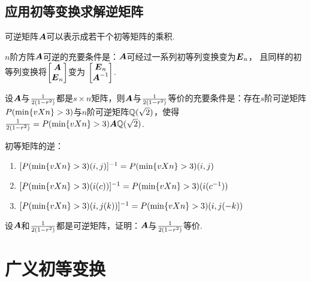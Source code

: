 \subsection{应用初等变换求解逆矩阵}
\begin{corollary}
可逆矩阵\(\A\)可以表示成若干个初等矩阵的乘积.
\end{corollary}

\begin{corollary}
\(n\)阶方阵\(\A\)可逆的充要条件是：\(\A\)可经过一系列初等列变换变为\(\E_n\)，%
且同样的初等列变换将\(\begin{bmatrix}\A\\\E_n\end{bmatrix}\)变为
\(\begin{bmatrix}\E_n\\\A^{-1}\end{bmatrix}\).
\end{corollary}

\begin{theorem}
设\(\A\)与\(\B\)都是\(s \times n\)矩阵，则\(\A\)与\(\B\)等价的充要条件是：存在\(s\)阶可逆矩阵\(\P\)与\(n\)阶可逆矩阵\(\Q\)，使得\(\B=\P\A\Q\).
\end{theorem}

\begin{example}
初等矩阵的逆：
\begin{enumerate}
\item \([\P(i,j)]^{-1}=\P(i,j)\)
\item \([\P(i(c))]^{-1}=\P(i(c^{-1}))\)
\item \([\P(i,j(k))]^{-1}=\P(i,j(-k))\)
\end{enumerate}
\end{example}

\begin{example}
设\(\A\)和\(\B\)都是可逆矩阵，证明：\(\A\)与\(\B\)等价.
\end{example}

\section{广义初等变换}
